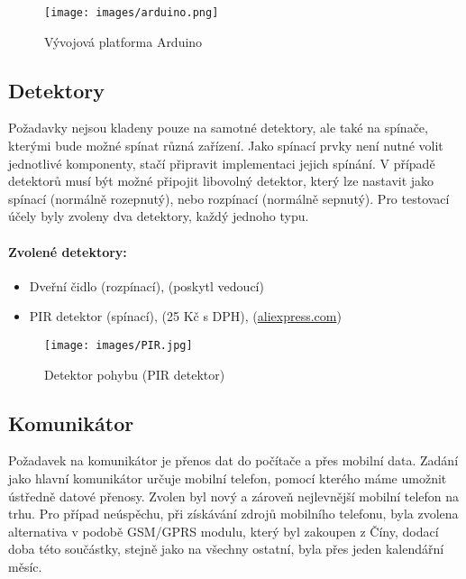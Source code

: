 \documentclass[FM,MP]{tulthesis}  %
\begin{document}
\begin{figure}[H]
\begin{center}
\texttt{[image: images/arduino.png]}
\caption{Vývojová platforma Arduino}
\label{image}
\end{center}
\end{figure}

\subsection{Detektory}
Požadavky nejsou kladeny pouze na samotné detektory, ale také na spínače, kterými bude možné spínat různá zařízení. Jako spínací prvky není nutné volit jednotlivé komponenty, stačí připravit implementaci jejich spínání. V případě detektorů musí být možné připojit libovolný detektor, který lze nastavit jako spínací (normálně rozepnutý), nebo rozpínací (normálně sepnutý). Pro testovací účely byly zvoleny dva detektory, každý jednoho typu.

\paragraph{Zvolené detektory:}
\begin{itemize}
\item Dveřní čidlo (rozpínací), (poskytl vedoucí)
\item PIR detektor (spínací), (25 Kč s DPH), (\url{aliexpress.com})
\end{itemize} 

\begin{figure}[H]
\begin{center}
\texttt{[image: images/PIR.jpg]}
\caption{Detektor pohybu (PIR detektor)}
\label{image}
\end{center}
\end{figure}

\subsection{Komunikátor}
Požadavek na komunikátor je přenos dat do počítače a přes mobilní data. Zadání jako hlavní komunikátor určuje mobilní telefon, pomocí kterého máme umožnit ústředně datové přenosy. Zvolen byl nový a zároveň nejlevnější mobilní telefon na trhu. Pro případ neúspěchu, při získávání zdrojů mobilního telefonu, byla zvolena alternativa v podobě GSM/GPRS modulu, který byl zakoupen z Číny, dodací doba této součástky, stejně jako na všechny ostatní, byla přes jeden kalendářní měsíc.
\end{document}
